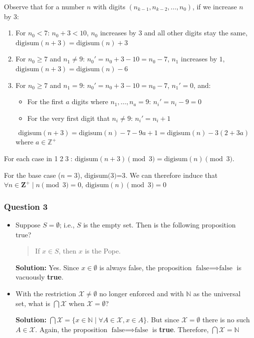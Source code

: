 \documentclass[
	letterpaper, %
	11pt, %
]{CSUniSchoolLabReport}
\begin{document}
Observe that for a number $n$ with digits $(n_{k-1}, n_{k-2}, \ldots, n_0)$, if we increase $n$ by $3$:
\begin{enumerate}
	\item[\textcircled{1}] For $n_0 < 7$: $n_0 + 3 < 10$, $n_0$ increases by $3$ and all other digits stay the same,
		$\mathrm{digisum}(n+3) = \mathrm{digisum}(n) + 3$
	\item[\textcircled{2}] For $n_0 \geq 7$ and $n_1 \neq 9$: $n_0' = n_0 + 3 - 10 = n_0 - 7$, $n_1$ increases by $1$,
		$\mathrm{digisum}(n+3) = \mathrm{digisum}(n) - 6$
	\item[\textcircled{3}] For $n_0 \geq 7$ and $n_1 = 9$: $n_0' = n_0 + 3 - 10 = n_0 - 7$, $n_1' = 0$, and:
		\begin{itemize}
			\item For the first $a$ digits where $n_1, \ldots, n_a = 9$: $n_i' = n_i - 9 = 0$
			\item For the very first digit that $n_i \neq 9$: $n_i' = n_i + 1$
		\end{itemize}
		\[ \mathrm{digisum}(n+3) = \mathrm{digisum}(n) - 7 - 9a + 1 = \mathrm{digisum}(n) - 3(2+3a) \]
		where $a \in \mathbb{Z}^+$
\end{enumerate}

For each case in \textcircled{1}\textcircled{2}\textcircled{3}: $\mathrm{digisum}(n+3) \pmod 3 = \mathrm{digisum}(n) \pmod 3$.

For the base case ($n=3$), $\text{digisum(3)=3}$. We can therefore induce that $\forall n \in \mathbf{Z^+} \mid n \pmod{3} = 0$, $\text{digisum}(n) \pmod{3} = 0$ 

\pagebreak

\subsubsection*{Question 3}
\begin{itemize}
	\item Suppose $S = \emptyset$; i.e., $S$ is the empty set. Then is the following proposition true? \begin{quote}If $x\in S$, then $x$ is the Pope.\end{quote}
	\textbf{Solution: } Yes. Since $x \in \emptyset$ is always false, the proposition $\text{false} \implies \text{false}$ is vacuously \textbf{true}. 
	\item With the restriction $\mathcal{X} \not= \emptyset$ no longer enforced and with $\mathbb{N}$ as the universal set, what is $\bigcap \mathcal{X}$ when $\mathcal{X} = \emptyset$?

	\textbf{Solution: } $\bigcap \mathcal{X} = \{x \in \mathbb{N} \mid \forall A \in \mathcal{X}, x \in A\}$. But since $\mathcal{X} = \emptyset$ there is no such $A \in \mathcal{X}$. Again, the proposition $\text{false} \implies \text{false}$ is \textbf{true}. Therefore, $\bigcap \mathcal{X} = \mathbb{N}$
\end{itemize}
\end{document}
